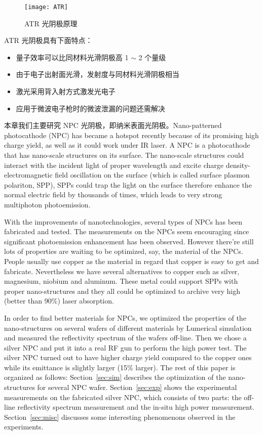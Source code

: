 \begin{figure}[htbp]
\centering
\texttt{[image: ATR]}
\caption{\label{fig:NPC} ATR 光阴极原理}
\end{figure}
	
ATR 光阴极具有下面特点：
\begin{itemize}
	\item 量子效率可以比同材料光滑阴极高 1 $\sim$ 2 个量级
	\item 由于电子出射面光滑，发射度与同材料光滑阴极相当
	\item 激光采用背入射方式激发光电子
	\item 应用于微波电子枪时的微波泄漏的问题还需解决
\end{itemize}

本章我们主要研究 NPC 光阴极，即纳米表面光阴极。Nano-patterned photocathode (NPC) has became a hotspot recently because of its promising high charge yield, as well as it could work under IR laser. A NPC is a photocathode that has nano-scale structures on its surface. The nano-scale structures could interact with the incident light of proper wavelength and excite charge density-electromagnetic field oscillation on the surface (which is called surface plasmon polariton, SPP), SPPs could trap the light on the surface therefore enhance the normal electric field by thousands of times, which leads to very strong multiphoton photoemission.

With the improvements of nanotechnologies, several types of NPCs has been fabricated and tested. The measurements on the NPCs seem encouraging since significant photoemission enhancement has been observed. However there're still lots of properties are waiting to be optimized, say, the material of the NPCs. People usually use copper as the material in regard that copper is easy to get and fabricate. Nevertheless we have several alternatives to copper such as silver, magnesium, niobium and aluminum. These metal could support SPPs with proper nano-structures and they all could be optimized to archive very high (better than 90\%) laser absorption.

In order to find better materials for NPCs, we optimized the properties of the nano-structures on several wafers of different materials by Lumerical simulation and measured the reflectivity spectrum of the wafers off-line. Then we chose a silver NPC and put it into a real RF gun to perform the high power test. The silver NPC turned out to have higher charge yield compared to the copper ones while its emittance is slightly larger (15\% larger). The rest of this paper is organized as follows: Section~\ref{sec:sim} describes the optimization of the nano-structures for several NPC wafer. Section~\ref{sec:exp} shows the experimental measurements on the fabricated silver NPC, which consists of two parts: the off-line reflectivity spectrum measurement and the in-situ high power measurement. Section~\ref{sec:misc} discusses some interesting phenomenons observed in the experiments.

